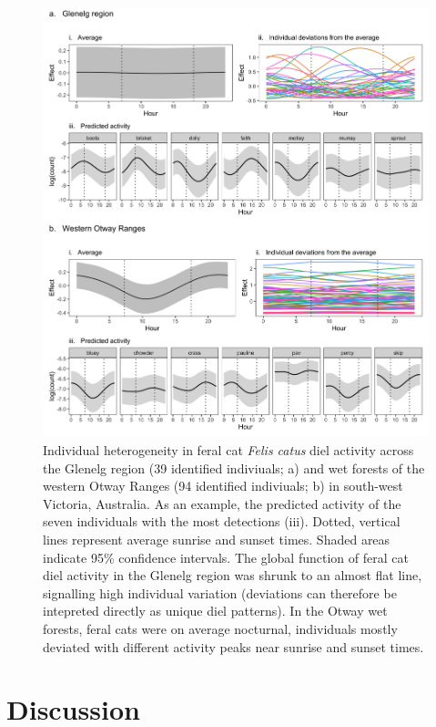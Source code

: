 \documentclass[11pt,a4paper,titlepage,twoside,openright]{style/unimelbthesis}
\begin{document}
\begin{mainmatter}
\begin{figure}
{\centering \includegraphics[width=1\linewidth]{figure/c4/cat_ind} 

}

\caption{Individual heterogeneity in feral cat \textit{Felis catus} diel activity across the Glenelg region (39 identified indiviuals; a) and wet forests of the western Otway Ranges (94 identified indiviuals; b) in south-west Victoria, Australia. As an example, the predicted activity of the seven individuals with the most detections (iii). Dotted, vertical lines represent average sunrise and sunset times. Shaded areas indicate 95\% confidence intervals. The global function of feral cat diel activity in the Glenelg region was shrunk to an almost flat line, signalling high individual variation (deviations can therefore be intepreted directly as unique diel patterns). In the Otway wet forests, feral cats were on average nocturnal, individuals mostly deviated with different activity peaks near sunrise and sunset times.}\label{fig:diel-individuals}
\end{figure}
\newpage

\hypertarget{discussion-1}{%
\section{Discussion}\label{discussion-1}}


\end{mainmatter}
\end{document}
